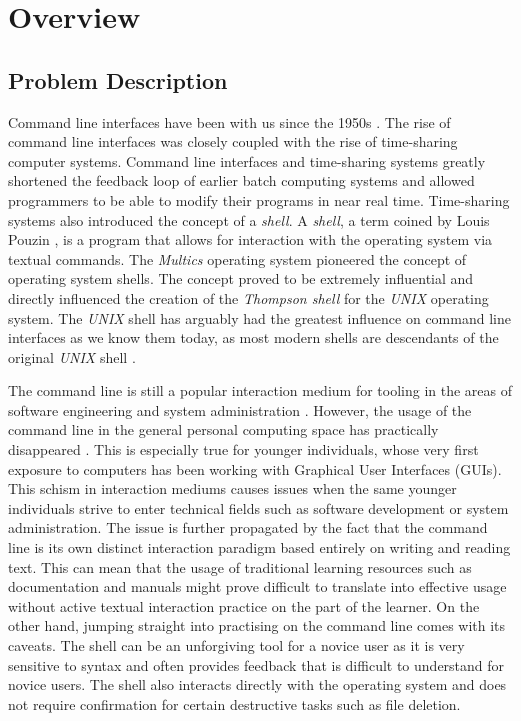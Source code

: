 \chapter{Overview}
\label{chap:overview}
\section{Problem Description}

Command line interfaces have been with us since the 1950s
\cite{raymond2004art}. The rise of command line interfaces was closely coupled
with the rise of time-sharing computer systems. Command line interfaces and
time-sharing systems greatly shortened the feedback loop of earlier batch
computing systems and allowed programmers to be able to modify their programs
in near real time. Time-sharing systems also introduced the concept of a
\textit{shell}. A \textit{shell}, a term coined by Louis Pouzin \cite{pouzin},
is a program that allows for interaction with the operating system via textual
commands\cite{mashey1976using}. The \textit{Multics}\cite{corbato1965introduction} operating system
pioneered the concept of operating system shells. The concept proved to be
extremely influential and directly influenced the creation of the
\textit{Thompson shell} for the \textit{UNIX} \cite{ritchie1974unix} operating
system. The \textit{UNIX} shell has arguably had the greatest influence on
command line interfaces as we know them today, as most modern shells are
descendants of the original \textit{UNIX} shell \cite{raymond2004art}.

The command line is still a popular interaction medium for tooling in the areas
of software engineering and system administration
\cite{hultstrand2015git,takayama2006trust}. However, the usage of the command
line in the general personal computing space has practically disappeared
\cite{reimer2005history}. This is especially true for younger individuals,
whose very first exposure to computers has been working with Graphical User
Interfaces (GUIs). This schism in interaction mediums causes issues when the
same younger individuals strive to enter technical fields such as software
development or system administration. The issue is further propagated by the
fact that the command line is its own distinct interaction paradigm based
entirely on writing and reading text. This can mean that the usage of
traditional learning resources such as documentation and manuals might prove
difficult to translate into effective usage without active textual interaction
practice on the part of the learner. On the other hand, jumping straight into
practising on the command line comes with its caveats. The shell can be an
unforgiving tool for a novice user as it is very sensitive to syntax and often
provides feedback that is difficult to understand for novice users. The shell
also interacts directly with the operating system and does not require
confirmation for certain destructive tasks such as file deletion.

